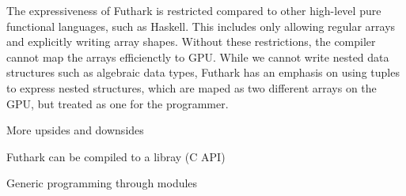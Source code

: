 The expressiveness of Futhark is restricted compared to other high-level pure
functional languages, such as Haskell. This includes only allowing regular
arrays and explicitly writing array shapes. Without these restrictions, the
compiler cannot map the arrays efficienctly to GPU. While we cannot write nested
data structures such as algebraic data types, Futhark has an emphasis on using
tuples to express nested structures, which are maped as two different arrays on
the GPU, but treated as one for the programmer.

{\red
More upsides and downsides

Futhark can be compiled to a libray (C API)

Generic programming through modules
}

